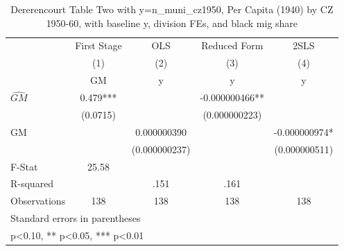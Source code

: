 \begin{table}[htbp]\centering
\def\sym#1{\ifmmode^{#1}\else\(^{#1}\)\fi}
\caption{Dererencourt Table Two with y=n\_muni\_cz1950, Per Capita (1940) by CZ 1950-60, with baseline y, division FEs, and black mig share}
\begin{tabular}{l*{4}{c}}
\toprule
                    & First Stage   &         OLS   &Reduced Form   &        2SLS   \\
                    &\multicolumn{1}{c}{(1)}&\multicolumn{1}{c}{(2)}&\multicolumn{1}{c}{(3)}&\multicolumn{1}{c}{(4)}\\
                    &\multicolumn{1}{c}{GM}&\multicolumn{1}{c}{y}&\multicolumn{1}{c}{y}&\multicolumn{1}{c}{y}\\
\midrule
$\hat{GM}$          &       0.479***&               &-0.000000466** &               \\
                    &    (0.0715)   &               &(0.000000223)   &               \\
\addlinespace
GM                  &               & 0.000000390   &               &-0.000000974*  \\
                    &               &(0.000000237)   &               &(0.000000511)   \\
\midrule
F-Stat              &       25.58   &               &               &               \\
R-squared           &               &        .151   &        .161   &               \\
Observations        &         138   &         138   &         138   &         138   \\
\bottomrule
\multicolumn{5}{l}{\footnotesize Standard errors in parentheses}\\
\multicolumn{5}{l}{\footnotesize * p<0.10, ** p<0.05, *** p<0.01}\\
\end{tabular}
\end{table}
